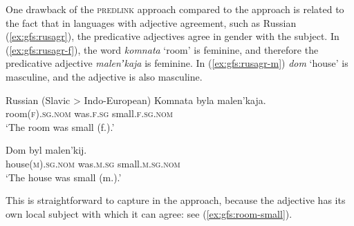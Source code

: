 \documentclass[output=paper]{../langscibook}
\begin{document}
One drawback of the \textsc{predlink} approach compared to the \XCOMP approach is related to the fact that in languages with adjective agreement, such as Russian (\ref{ex:gfs:rusagr}), the predicative adjectives agree in gender with the subject. In (\ref{ex:gfs:rusagr-f}), the word \textit{komnata} `room' is feminine, and therefore the predicative adjective \textit{malenʼkaja} is feminine. In (\ref{ex:gfs:rusagr-m}) \textit{dom} `house' is masculine, and the adjective is also masculine.
 
 \ea\label{ex:gfs:rusagr} Russian (Slavic > Indo-European)
    \ea\label{ex:gfs:rusagr-f}
    \gll Komnata byla malen'kaja.\\
    room(\textsc{f}).\textsc{sg.nom} was.\textsc{f.sg} small.\textsc{f}.\textsc{sg.nom}\\
    \glt `The room was small (f.).'
    
    \ex\label{ex:gfs:rusagr-m}
    \gll Dom byl malen'kij.\\
    house(\textsc{m}).\textsc{sg.nom} was.\textsc{m.sg} small.\textsc{m.sg.nom}\\
    \glt `The house was small (m.).'
    \z
 \z
 
\noindent This is straightforward to capture in the \XCOMP approach, because the adjective has its own local subject with which it can agree: see (\ref{ex:gfs:room-small}).
 
 
\end{document}

